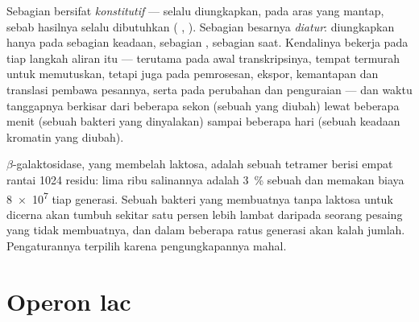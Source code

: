 \begin{proposition}\label{prop:b1:expression-control:levels}
Sebagian  bersifat \emph{konstitutif} --- selalu diungkapkan, pada
aras yang mantap, sebab hasilnya selalu dibutuhkan ( ,
 ). Sebagian besarnya \emph{diatur}: diungkapkan
hanya pada sebagian keadaan, sebagian , sebagian saat. Kendalinya
bekerja pada tiap langkah aliran itu --- terutama pada awal
transkripsinya, tempat termurah untuk memutuskan, tetapi juga pada
pemrosesan, ekspor, kemantapan dan translasi pembawa pesannya, serta
pada perubahan dan penguraian  --- dan waktu tanggapnya
berkisar dari beberapa sekon (sebuah  yang diubah) lewat
beberapa menit (sebuah  bakteri yang dinyalakan) sampai beberapa
hari (sebuah keadaan kromatin yang diubah).
\end{proposition}

\begin{example}\label{ex:b1:expression-control:economy}
 $\beta$-galaktosidase, yang membelah laktosa, adalah sebuah
tetramer berisi empat rantai \qty{1024}{} residu: lima ribu salinannya
adalah \qty{3}{\%}  sebuah  dan memakan biaya \qty{8e7}{} 
tiap generasi. Sebuah bakteri yang membuatnya tanpa laktosa untuk
dicerna akan tumbuh sekitar satu persen lebih lambat daripada seorang
pesaing yang tidak membuatnya, dan dalam beberapa ratus generasi akan
kalah jumlah. Pengaturannya terpilih karena pengungkapannya mahal.
\end{example}

\section{Operon lac}

